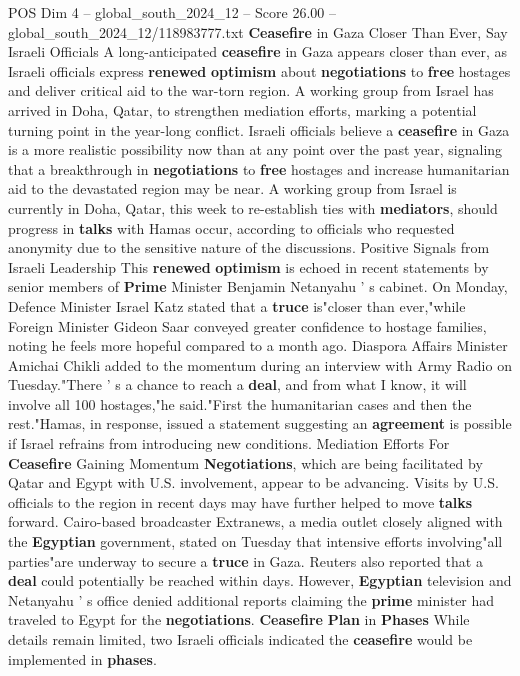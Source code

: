 \begin{textsample}{POS Dim 4 – global\_south\_2024\_12 – Score 26.00 – global\_south\_2024\_12/118983777.txt}  \label{ex:f4_pos_252}
\textbf{Ceasefire} in Gaza Closer Than Ever, Say Israeli Officials A long-anticipated \textbf{ceasefire} in Gaza appears closer than ever, as Israeli officials express \textbf{renewed} \textbf{optimism} about \textbf{negotiations} to \textbf{free} hostages and deliver critical aid to the war-torn region.
A working group from Israel has arrived in Doha, Qatar, to strengthen mediation efforts, marking a potential turning point in the year-long conflict.
Israeli officials believe a \textbf{ceasefire} in Gaza is a more realistic possibility now than at any point over the past year, signaling that a breakthrough in \textbf{negotiations} to \textbf{free} hostages and increase humanitarian aid to the devastated region may be near.
A working group from Israel is currently in Doha, Qatar, this week to re-establish ties with \textbf{mediators}, should progress in \textbf{talks} with Hamas occur, according to officials who requested anonymity due to the sensitive nature of the discussions.
Positive Signals from Israeli Leadership This \textbf{renewed} \textbf{optimism} is echoed in recent statements by senior members of \textbf{Prime} Minister Benjamin Netanyahu ' s cabinet.
On Monday, Defence Minister Israel Katz stated that a \textbf{truce} is"closer than ever,"while Foreign Minister Gideon Saar conveyed greater confidence to hostage families, noting he feels more hopeful compared to a month ago.
Diaspora Affairs Minister Amichai Chikli added to the momentum during an interview with Army Radio on Tuesday."There ' s a chance to reach a \textbf{deal}, and from what I know, it will involve all 100 hostages,"he said."First the humanitarian cases and then the rest."Hamas, in response, issued a statement suggesting an \textbf{agreement} is possible if Israel refrains from introducing new conditions.
Mediation Efforts For \textbf{Ceasefire} Gaining Momentum \textbf{Negotiations}, which are being facilitated by Qatar and Egypt with U.S. involvement, appear to be advancing.
Visits by U.S. officials to the region in recent days may have further helped to move \textbf{talks} forward.
Cairo-based broadcaster Extranews, a media outlet closely aligned with the \textbf{Egyptian} government, stated on Tuesday that intensive efforts involving"all parties"are underway to secure a \textbf{truce} in Gaza.
Reuters also reported that a \textbf{deal} could potentially be reached within days.
However, \textbf{Egyptian} television and Netanyahu ' s office denied additional reports claiming the \textbf{prime} minister had traveled to Egypt for the \textbf{negotiations}. \textbf{Ceasefire} \textbf{Plan} in \textbf{Phases} While details remain limited, two Israeli officials indicated the \textbf{ceasefire} would be implemented in \textbf{phases}.

\end{textsample}
